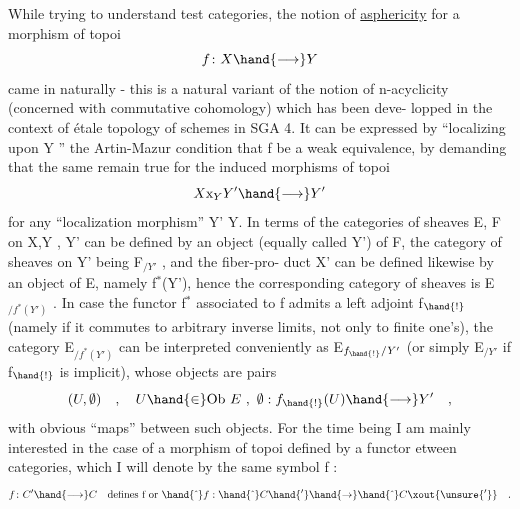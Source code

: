 While trying to understand test categories, the notion of \uline{asphericity}
for a morphism of topoi
\[ f\colon X \hand{\longrightarrow} Y \]
came in naturally - this is a natural  variant of the notion of
n-acyclicity (concerned with commutative cohomology) which has been deve-%
lopped in the context of étale topology of schemes in SGA 4. It can be
expressed by ``localizing upon Y '' the Artin-Mazur condition that f be
a weak equivalence, by demanding that the same remain true for the induced
morphisms of topoi
\[ X\mathrm{x}_{Y}Y' \hand{\longrightarrow} Y' \]
for any ``localization morphism'' Y'\hand{$\longrightarrow$} Y. In terms of the categories of
sheaves  E, F on X,Y , Y' can be defined by an object (equally called
Y') of F, the category of sheaves on Y' being F$_{/Y'}$ , and the fiber-pro-%
duct X' can be defined likewise by an object  of E, namely  f$^{*}$(Y'),
hence the corresponding category of sheaves is E$_{/f^{*}(Y')}$ . In case the
functor f$^{*}$ associated to f admits a left adjoint f$_{\hand{!}}$ (namely if it commutes
to arbitrary inverse limits, not only to finite one's), the category
E$_{/f^{*}(Y')}$ can be interpreted conveniently as  E$_{f_{\hand{!}}/Y'}$ (or simply E$_{/Y'}$
if f$_{\hand{!}}$ is implicit), whose objects are pairs
\[ (U,\emptyset) \quad , \quad U \hand{\in} \mathrm{Ob}\ E \ , \ \emptyset : f_{\hand{!}}(U) \hand{\longrightarrow} Y' \quad , \]
with obvious ``maps'' between such objects. For the time being I am mainly
interested in the case of a morphism of topoi defined by a functor etween
categories, which I will denote by the same symbol f :
\[ f\colon C' \hand{\longrightarrow} C \quad \text{defines f or } \hand{\hat{\ }}f : \hand{\hat{\ }}C\hand{'} \hand{\to} \hand{\hat{\ }}C\xout{\unsure{'}} \quad . \]
